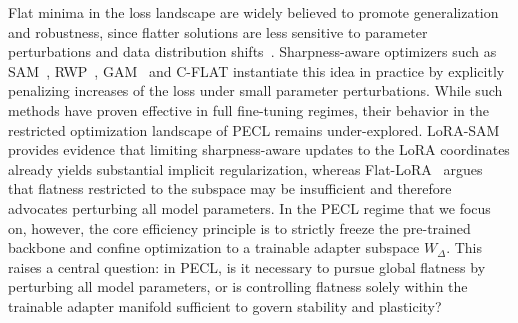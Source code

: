 \documentclass[10pt]{article} %
\begin{document}
Flat minima in the loss landscape are widely believed to promote generalization and robustness, since flatter solutions are less sensitive to parameter perturbations and data distribution shifts~\citep{FlatMinima1997,wu2017understandinggeneralizationdeeplearning,chaudhariEntropySGDBiasingGradient2019,NEURIPS2020_518a38cc,NEURIPS2021_995f5e03,JMLRAnEmpiricalInvestigatio,yangRevisitingFlatnessAwareOptimization2025}. Sharpness-aware optimizers such as SAM~\citep{foretSharpnessAwareMinimizationEfficiently2021}, RWP~\citep{pmlr-v151-bisla22a}, GAM~\citep{zhangGradientNormAware2023} and C-FLAT\cite{NEURIPS2024_C-Flat} instantiate this idea in practice by explicitly penalizing increases of the loss under small parameter perturbations.
While such methods have proven effective in full fine-tuning regimes, their behavior in the restricted optimization landscape of PECL remains under-explored. 
LoRA-SAM~\citep{NEURIPS2024_4eb2c0ad} provides evidence that limiting sharpness-aware updates to the LoRA coordinates already yields substantial implicit regularization, whereas Flat-LoRA~\citep{li2025flatloralowrankadaptationflat} argues that flatness restricted to the subspace may be insufficient and therefore advocates perturbing all model parameters.
In the PECL regime that we focus on, however, the core efficiency principle is to strictly freeze the pre-trained backbone and confine optimization to a trainable adapter subspace $W_\Delta$. 
This raises a central question: in PECL, is it necessary to pursue global flatness by perturbing all model parameters, or is controlling flatness solely within the trainable adapter manifold sufficient to govern stability and plasticity?








\end{document}
